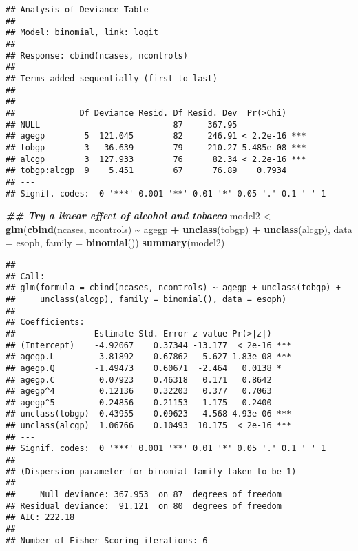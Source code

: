 \documentclass[
]{article}
\newenvironment{Shaded}{\begin{snugshade}}{\end{snugshade}}
\newcommand{\AttributeTok}[1]{\textcolor[rgb]{0.13,0.29,0.53}{#1}}
\newcommand{\DocumentationTok}[1]{\textcolor[rgb]{0.56,0.35,0.01}{\textbf{\textit{#1}}}}
\newcommand{\FunctionTok}[1]{\textcolor[rgb]{0.13,0.29,0.53}{\textbf{#1}}}
\newcommand{\NormalTok}[1]{#1}
\newcommand{\OtherTok}[1]{\textcolor[rgb]{0.56,0.35,0.01}{#1}}
\newcommand{\SpecialCharTok}[1]{\textcolor[rgb]{0.81,0.36,0.00}{\textbf{#1}}}
\begin{document}
\begin{verbatim}
## Analysis of Deviance Table
## 
## Model: binomial, link: logit
## 
## Response: cbind(ncases, ncontrols)
## 
## Terms added sequentially (first to last)
## 
## 
##             Df Deviance Resid. Df Resid. Dev  Pr(>Chi)    
## NULL                           87     367.95              
## agegp        5  121.045        82     246.91 < 2.2e-16 ***
## tobgp        3   36.639        79     210.27 5.485e-08 ***
## alcgp        3  127.933        76      82.34 < 2.2e-16 ***
## tobgp:alcgp  9    5.451        67      76.89    0.7934    
## ---
## Signif. codes:  0 '***' 0.001 '**' 0.01 '*' 0.05 '.' 0.1 ' ' 1
\end{verbatim}

\begin{Shaded}
\begin{Highlighting}[]
\DocumentationTok{\#\# Try a linear effect of alcohol and tobacco}
\NormalTok{model2 }\OtherTok{\textless{}{-}} \FunctionTok{glm}\NormalTok{(}\FunctionTok{cbind}\NormalTok{(ncases, ncontrols) }\SpecialCharTok{\textasciitilde{}}\NormalTok{ agegp }\SpecialCharTok{+} \FunctionTok{unclass}\NormalTok{(tobgp)}
                                         \SpecialCharTok{+} \FunctionTok{unclass}\NormalTok{(alcgp),}
              \AttributeTok{data =}\NormalTok{ esoph, }\AttributeTok{family =} \FunctionTok{binomial}\NormalTok{())}
\FunctionTok{summary}\NormalTok{(model2)}
\end{Highlighting}
\end{Shaded}

\begin{verbatim}
## 
## Call:
## glm(formula = cbind(ncases, ncontrols) ~ agegp + unclass(tobgp) + 
##     unclass(alcgp), family = binomial(), data = esoph)
## 
## Coefficients:
##                Estimate Std. Error z value Pr(>|z|)    
## (Intercept)    -4.92067    0.37344 -13.177  < 2e-16 ***
## agegp.L         3.81892    0.67862   5.627 1.83e-08 ***
## agegp.Q        -1.49473    0.60671  -2.464   0.0138 *  
## agegp.C         0.07923    0.46318   0.171   0.8642    
## agegp^4         0.12136    0.32203   0.377   0.7063    
## agegp^5        -0.24856    0.21153  -1.175   0.2400    
## unclass(tobgp)  0.43955    0.09623   4.568 4.93e-06 ***
## unclass(alcgp)  1.06766    0.10493  10.175  < 2e-16 ***
## ---
## Signif. codes:  0 '***' 0.001 '**' 0.01 '*' 0.05 '.' 0.1 ' ' 1
## 
## (Dispersion parameter for binomial family taken to be 1)
## 
##     Null deviance: 367.953  on 87  degrees of freedom
## Residual deviance:  91.121  on 80  degrees of freedom
## AIC: 222.18
## 
## Number of Fisher Scoring iterations: 6
\end{verbatim}
\end{document}
